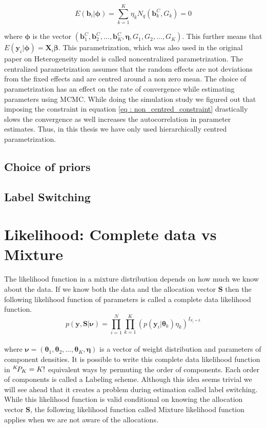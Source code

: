 \begin{equation}
\label{eq : non_centred_constraint}
E(\boldsymbol{b}_i | \boldsymbol{\phi}) = \sum_{k=1}^{K} \eta_k N_q(\boldsymbol{b}_k^C, G_k) = 0
\end{equation}

where $\boldsymbol{\phi}$ is the vector $(\boldsymbol{b}_1^C, \boldsymbol{b}_2^C, \ldots, \boldsymbol{b}_K^C, \boldsymbol{\eta}, G_1, G_2, \ldots, G_K)$. This further means that $E(\boldsymbol{y}_i | \boldsymbol{\phi}) = \boldsymbol{X}_{i}\boldsymbol{\beta}$. This parametrization, which was also used in the original paper on Heterogeneity model \citep{verbeke_linear_1996} is called noncentralized parametrization. The centralized parametrization assumes that the random effects are not deviations from the fixed effects and are centred around a non zero mean.
The choice of parametrization has an effect on the rate of convergence while estimating parameters using MCMC. While doing the simulation study we figured out that imposing the constraint in equation \ref{eq : non_centred_constraint} drastically slows the convergence as well increases the autocorrelation in parameter estimates. Thus, in this thesis we have only used hierarchically centred parametrization.

\subsection{Choice of priors}
\label{subsec : choice_priors}

\subsection{Label Switching}

\section{Likelihood: Complete data vs Mixture}
The likelihood function in a mixture distribution depends on how much we know about the data. If we know both the data and the allocation vector $\boldsymbol{S}$ then the following likelihood function of parameters is called a complete data likelihood function.\\
$$p(\boldsymbol{y, S}|\boldsymbol{\nu}) = \prod_{i=1}^{N} \prod_{k=1}^{K} (p(\boldsymbol{y}_i | \boldsymbol{\theta}_k) \eta_k)^{I_{S_i=k}}$$\\
where $\boldsymbol{\nu} = (\boldsymbol{\theta}_1, \boldsymbol{\theta}_2, \ldots, \boldsymbol{\theta}_K, \boldsymbol{\eta})$ is a vector of weight distribution and parameters of component densities. It is possible to write this complete data likelihood function in ${}^{K}\!P_{K} = K!$ equivalent ways by permuting the order of components. Each order of components is called a Labeling scheme. Although this idea seems trivial we will see ahead that it creates a problem during estimation called label switching. While this likelihood function is valid conditional on knowing the allocation vector $\boldsymbol{S}$, the following likelihood function called Mixture likelihood function applies when we are not aware of the allocations.\\

